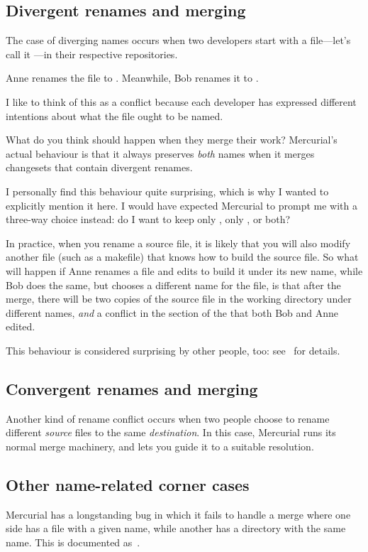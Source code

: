 \subsection{Divergent renames and merging}

The case of diverging names occurs when two developers start with a
file---let's call it ---in their respective
repositories.

Anne renames the file to .
Meanwhile, Bob renames it to .

I like to think of this as a conflict because each developer has
expressed different intentions about what the file ought to be named.

What do you think should happen when they merge their work?
Mercurial's actual behaviour is that it always preserves \emph{both}
names when it merges changesets that contain divergent renames.

I personally find this behaviour quite surprising, which is why I
wanted to explicitly mention it here.  I would have expected Mercurial
to prompt me with a three-way choice instead: do I want to keep only
, only , or both?

In practice, when you rename a source file, it is likely that you will
also modify another file (such as a makefile) that knows how to build
the source file.  So what will happen if Anne renames a file and edits
 to build it under its new name, while Bob does the
same, but chooses a different name for the file, is that after the
merge, there will be two copies of the source file in the working
directory under different names, \emph{and} a conflict in the section
of the  that both Bob and Anne edited.

This behaviour is considered surprising by other people, too:
see~ for details.

\subsection{Convergent renames and merging}

Another kind of rename conflict occurs when two people choose to
rename different \emph{source} files to the same \emph{destination}.
In this case, Mercurial runs its normal merge machinery, and lets you
guide it to a suitable resolution.

\subsection{Other name-related corner cases}

Mercurial has a longstanding bug in which it fails to handle a merge
where one side has a file with a given name, while another has a
directory with the same name.  This is documented as~.

